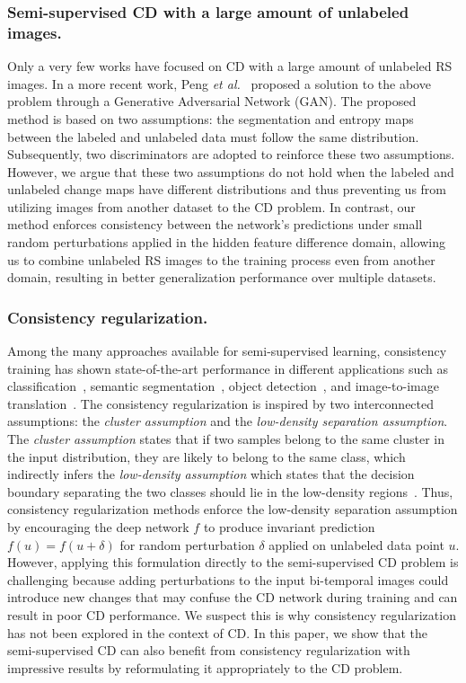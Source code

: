 \documentclass[runningheads]{llncs}
\begin{document}
\subsubsection{Semi-supervised CD with a large amount of unlabeled images.} \label{sec:sota_semi} Only a very few works have focused on CD with a large amount of unlabeled RS images. In a more recent work,  Peng \textit{et al.}~\cite{SemiCDNet} proposed a solution to the above problem through a Generative Adversarial Network (GAN). The proposed method is based on two assumptions: the segmentation and entropy maps between the labeled and unlabeled data must follow the same distribution. Subsequently, two discriminators are adopted to reinforce these two assumptions. However, we argue that these two assumptions do not hold when the labeled and unlabeled change maps have different distributions and thus preventing us from utilizing images from another dataset to the CD problem. In contrast, our method enforces consistency between the network's predictions under small random perturbations applied in the hidden feature difference domain, allowing us to combine unlabeled RS images to the training process even from another domain, resulting in better generalization performance over multiple datasets.
\vspace{-5mm}
\subsubsection{Consistency regularization.} Among the many approaches available for semi-supervised learning, consistency training has shown state-of-the-art performance in different applications such as classification~\cite{oliver2018realistic,sohn2020fixmatch,verma2019interpolation}, semantic segmentation~\cite{ouali2020semi,mittal2019semi,lai2021semi}, object detection~\cite{jeong2019consistency}, and image-to-image translation~\cite{Wang_2020_CVPR,mustafa2020transformation}. The consistency regularization is inspired by two interconnected assumptions: the \textit{cluster assumption} and the \textit{low-density separation assumption}. The \textit{cluster assumption} states that if two samples belong to the same cluster in the input distribution, they are likely to belong to the same class, which indirectly infers the \textit{low-density assumption} which states that  the decision boundary separating the two classes should lie in the low-density regions~\cite{chapelle2009semi}. Thus, consistency regularization methods enforce the low-density separation assumption by encouraging the deep network $f$ to produce invariant prediction $f(u) = f(u+\delta)$ for random perturbation $\delta$ applied on unlabeled data point $u$. However, applying this formulation directly to the semi-supervised CD problem is challenging because adding perturbations to the input bi-temporal images could introduce new changes that may confuse the CD network during training and can result in poor CD performance. We suspect this is why consistency regularization has not been explored in the context of CD. In this paper, we show that the semi-supervised CD can also benefit from consistency regularization with impressive results by reformulating it appropriately to the CD problem.
\vspace{-4mm}
\end{document}
